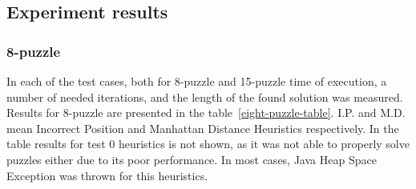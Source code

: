 \documentclass[12pt]{article}
\begin{document}
\subsection {Experiment results }

\subsubsection {8-puzzle}

In each of the test cases, both for 8-puzzle and 15-puzzle time of execution, a number of needed iterations, and the length of the found solution was measured. Results for 8-puzzle are presented in the table~\ref{eight-puzzle-table}. I.P. and M.D. mean Incorrect Position and Manhattan Distance Heuristics respectively. In the table results for test 0 heuristics is not shown, as it was not able to properly solve puzzles either due to its poor performance. In most cases, Java Heap Space Exception was thrown for this heuristics.
\end{document}
